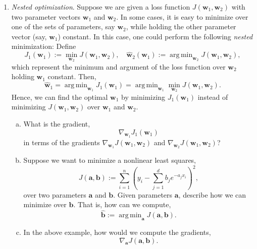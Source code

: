 \documentclass[11pt]{article}
\def\argmin{\mathop{\mathrm{arg\,min}}}
\newcommand{\abf}{\mathbf{a}}
\newcommand{\bbf}{\mathbf{b}}
\newcommand{\wbf}{\mathbf{w}}
\newcommand{\wbfhat}{\widehat{\mathbf{w}}}
\begin{document}
\begin{enumerate}
\item \emph{Nested optimization}.  Suppose we are given a loss function 
$J(\wbf_1,\wbf_2)$ with two parameter vectors $\wbf_1$ and $\wbf_2$.  
In some cases, it is easy to minimize over one of the sets of parameters, say 
$\wbf_2$, while holding the other parameter vector (say, $\wbf_1$) constant.
In this case, one could perform the following \emph{nested} minimization:
Define
\[
    J_1(\wbf_1) := \min_{\wbf_2} J(\wbf_1,\wbf_2), \quad
    \wbfhat_2(\wbf_1) := \argmin_{\wbf_2} J(\wbf_1,\wbf_2),
\]
which represent the minimum and argument of the loss function over $\wbf_2$
holding $\wbf_1$ constant.   Then, 
\[
    \wbfhat_1 = \argmin_{\wbf_1} J_1(\wbf_1) = \argmin_{\wbf_1} \min_{\wbf_2}
    J(\wbf_1,\wbf_2).
\]
Hence, we can find the optimal $\wbf_1$ by minimizing $J_1(\wbf_1)$
instead of minimizing $J(\wbf_1,\wbf_2)$ over $\wbf_1$ and $\wbf_2$.
\begin{enumerate}[(a)]
\item What is the gradient, 
\[
    \nabla_{\wbf_1} J_1(\wbf_1)
\]
in terms of the gradients $\nabla_{\wbf_1} J(\wbf_1,\wbf_2)$ and 
$\nabla_{\wbf_2} J(\wbf_1,\wbf_2)$?

\item Suppose we want to minimize a nonlinear least squares,
\[
    J(\abf,\bbf) := \sum_{i=1}^n \left( y_i - 
        \sum_{j=1}^d b_j e^{-a_jx_i} \right)^2,
\]
over two parameters $\abf$ and $\bbf$.  Given parameters $\abf$, 
describe how we can minimize over $\bbf$.  That is, how can we compute,
\[
    \hat{\bbf} := \argmin_{\abf} J(\abf,\bbf).
\]

\item In the above example, how would we compute the gradients,
\[
    \nabla_\abf J(\abf,\bbf).
\]

\end{enumerate}

\end{enumerate}
\end{document}
